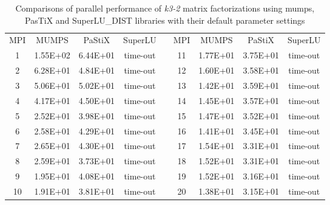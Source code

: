 \begin{table}[!t]
\centering
\begin{tabular}{|c|c|c|c|l|c|c|c|c|}
\cline{1-4} \cline{6-9}
MPI & MUMPS    & PaStiX   & SuperLU &  & MPI & MUMPS    & PaStiX   & SuperLU \\ \cline{1-4} \cline{6-9} 
1   & 1.55E+02 & 6.44E+01 & time-out &  & 11  & 1.77E+01 & 3.75E+01 & time-out \\ \cline{1-4} \cline{6-9} 
2   & 6.28E+01 & 4.84E+01 & time-out &  & 12  & 1.60E+01 & 3.58E+01 & time-out \\ \cline{1-4} \cline{6-9} 
3   & 5.06E+01 & 5.02E+01 & time-out &  & 13  & 1.42E+01 & 3.59E+01 & time-out \\ \cline{1-4} \cline{6-9} 
4   & 4.17E+01 & 4.50E+01 & time-out &  & 14  & 1.45E+01 & 3.57E+01 & time-out \\ \cline{1-4} \cline{6-9} 
5   & 2.52E+01 & 3.98E+01 & time-out &  & 15  & 1.47E+01 & 3.52E+01 & time-out \\ \cline{1-4} \cline{6-9} 
6   & 2.58E+01 & 4.29E+01 & time-out &  & 16  & 1.41E+01 & 3.45E+01 & time-out \\ \cline{1-4} \cline{6-9} 
7   & 2.65E+01 & 4.30E+01 & time-out &  & 17  & 1.54E+01 & 3.31E+01 & time-out \\ \cline{1-4} \cline{6-9} 
8   & 2.59E+01 & 3.73E+01 & time-out &  & 18  & 1.52E+01 & 3.31E+01 & time-out \\ \cline{1-4} \cline{6-9} 
9   & 1.95E+01 & 4.08E+01 & time-out &  & 19  & 1.52E+01 & 3.16E+01 & time-out \\ \cline{1-4} \cline{6-9} 
10  & 1.91E+01 & 3.81E+01 & time-out &  & 20  & 1.38E+01 & 3.15E+01 & time-out \\ \cline{1-4} \cline{6-9} 
\end{tabular}
\caption{Comparisons of parallel performance of  \textit{k3-2} matrix factorizations using \acrshort{mumps}, PasTiX and SuperLU\_DIST libraries with their default parameter settings}
\label{table:app-lc-k3-2-result}
\end{table}


